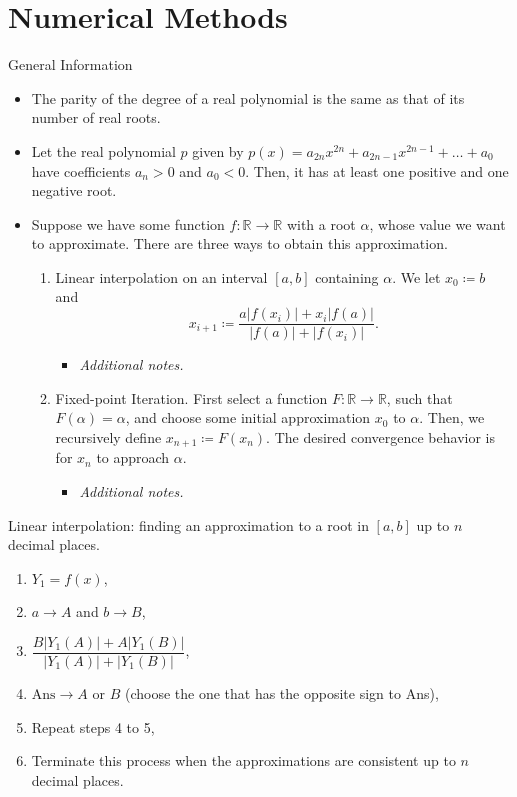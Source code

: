 \documentclass[../Notes.tex]{subfiles}
\begin{document}
    \chapter{Numerical Methods}
    \begin{stbox}{General Information}
        \begin{itemize}
            \item The parity of the degree of a real polynomial is the same as that of its number of real roots.
            \item Let the real polynomial \(p\) given by \(p(x)=a_{2n}x^{2n}+a_{2n-1}x^{2n-1}+\dots+a_0\) have coefficients \(a_n>0\) and \(a_0<0\). Then, it has at least one positive and one negative root.
            \item Suppose we have some function \(f \colon \mathbb{R}\to \mathbb{R}\) with a root \(\alpha\), whose value we want to approximate. There are three ways to obtain this approximation.
            \begin{enumerate}
                \item Linear interpolation on an interval \([a,b]\) containing \(\alpha\). We let \(x_0\coloneq b\) and
                \[x_{i+1}\coloneq\frac{a \lvert f(x_i) \rvert+x_i \lvert f(a) \rvert}{\lvert f(a) \rvert+\lvert f(x_i) \rvert}.\]
                \begin{itemize}
                    \item \emph{Additional notes.}
                \end{itemize}
                \item Fixed-point Iteration. First select a function \(F \colon \mathbb{R}\to \mathbb{R}\), such that \(F(\alpha)=\alpha\), and choose some initial approximation \(x_0\) to \(\alpha\). Then, we recursively define \(x_{n+1} \coloneq F(x_n)\). The desired convergence behavior is for \(x_n\) to approach \(\alpha\).
                \begin{itemize}
                    \item \emph{Additional notes.}
                \end{itemize}
            \end{enumerate}
        \end{itemize}
    \end{stbox}
    \begin{GCSkills}{}
        Linear interpolation: finding an approximation to a root in \([a,b]\) up to \(n\) decimal places.
        \begin{enumerate}
          \item \(Y_1=f(x)\),
          \item \(a \to A\) and \(b \to B\),
          \item \(\dfrac{B \lvert Y_1(A) \rvert+A \lvert Y_1(B) \rvert}{\lvert Y_1(A) \rvert+\lvert Y_1(B) \rvert}\),
          \item \(\text{Ans}\to A \text{ or } B\) (choose the one that has the opposite sign to Ans),
          \item Repeat steps 4 to 5,
          \item Terminate this process when the approximations are consistent up to \(n\) decimal places.
        \end{enumerate}
      \end{GCSkills}
\end{document}
